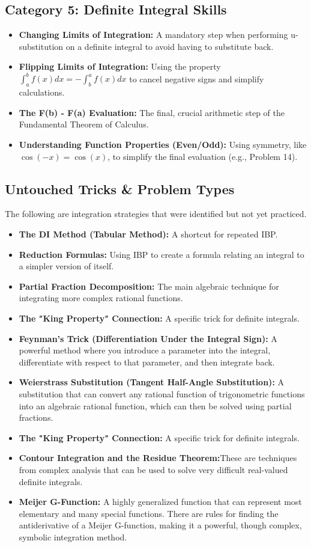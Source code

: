 \documentclass{article}
\begin{document}
\subsection*{Category 5: Definite Integral Skills}
\begin{itemize}
    \item \textbf{Changing Limits of Integration:} A mandatory step when performing u-substitution on a definite integral to avoid having to substitute back.
    \item \textbf{Flipping Limits of Integration:} Using the property $ \int_a^b f(x)dx = -\int_b^a f(x)dx $ to cancel negative signs and simplify calculations.
    \item \textbf{The F(b) - F(a) Evaluation:} The final, crucial arithmetic step of the Fundamental Theorem of Calculus.
    \item \textbf{Understanding Function Properties (Even/Odd):} Using symmetry, like $ \cos(-x)=\cos(x) $, to simplify the final evaluation (e.g., Problem 14).
\end{itemize}

\subsection*{Untouched Tricks \& Problem Types}
The following are integration strategies that were identified but not yet practiced.
\begin{itemize}
    \item \textbf{The DI Method (Tabular Method):} A shortcut for repeated IBP.
    \item \textbf{Reduction Formulas:} Using IBP to create a formula relating an integral to a simpler version of itself.
    \item \textbf{Partial Fraction Decomposition:} The main algebraic technique for integrating more complex rational functions.
    \item \textbf{The "King Property" Connection:} A specific trick for definite integrals.
    \item \textbf{Feynman's Trick (Differentiation Under the Integral Sign):} A powerful method where you introduce a parameter into the integral, differentiate with respect to that parameter, and then integrate back.
    \item \textbf{Weierstrass Substitution (Tangent Half-Angle Substitution):} A substitution that can convert any rational function of trigonometric functions into an algebraic rational function, which can then be solved using partial fractions.
    \item \textbf{The "King Property" Connection:} A specific trick for definite integrals.
    \item \textbf{Contour Integration and the Residue Theorem:}These are techniques from complex analysis that can be used to solve very difficult real-valued definite integrals.
    \item \textbf{Meijer G-Function:} A highly generalized function that can represent most elementary and many special functions. There are rules for finding the antiderivative of a Meijer G-function, making it a powerful, though complex, symbolic integration method.
 
    
\end{itemize}
\end{document}
